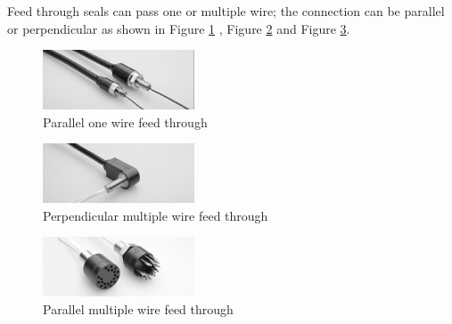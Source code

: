 Feed through seals can pass one or multiple wire; the connection can be parallel or perpendicular as shown in Figure \ref{fig:cable_feedthrough1} , Figure \ref{fig:cable_feedthrough2} and Figure \ref{fig:cable_feedthrough3}.

\begin{figure}[H]
    \centering
    \includegraphics[width=0.4\textwidth]{Sections/LiteratureReview/cables/par_one_feed.jpg}
    \caption{Parallel one wire feed through \cite{macartney_subconn_nodate}}
    \label{fig:cable_feedthrough1}
\end{figure}

\begin{figure}[H]
    \centering
    \includegraphics[width=0.4\textwidth]{Sections/LiteratureReview/cables/per_multi_feed.jpg}
    \caption{Perpendicular multiple wire feed through \cite{macartney_subconn_nodate}}
    \label{fig:cable_feedthrough2}
\end{figure}

\begin{figure}[H]
    \centering
    \includegraphics[width=0.4\textwidth]{Sections/LiteratureReview/cables/par_multi_feed.jpg}
    \caption{Parallel multiple wire feed through \cite{macartney_micro_nodate}}
    \label{fig:cable_feedthrough3}
\end{figure}

\newpage

